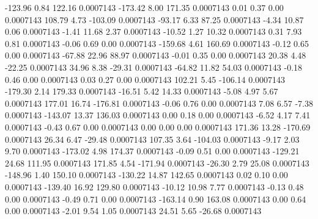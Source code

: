      -123.96        0.84      122.16     0.0007143
     -173.42        8.00      171.35     0.0007143
        0.01        0.37        0.00     0.0007143
      108.79        4.73     -103.09     0.0007143
      -93.17        6.33       87.25     0.0007143
       -4.34       10.87        0.06     0.0007143
       -1.41       11.68        2.37     0.0007143
      -10.52        1.27       10.32     0.0007143
        0.31        7.93        0.81     0.0007143
       -0.06        0.69        0.00     0.0007143
     -159.68        4.61      160.69     0.0007143
       -0.12        0.65        0.00     0.0007143
      -67.88       22.96       88.97     0.0007143
       -0.01        0.35        0.00     0.0007143
       20.38        4.48      -22.25     0.0007143
       34.96        8.38      -29.31     0.0007143
      -64.82       11.82       54.03     0.0007143
       -0.18        0.46        0.00     0.0007143
        0.03        0.27        0.00     0.0007143
      102.21        5.45     -106.14     0.0007143
     -179.30        2.14      179.33     0.0007143
      -16.51        5.42       14.33     0.0007143
       -5.08        4.97        5.67     0.0007143
      177.01       16.74     -176.81     0.0007143
       -0.06        0.76        0.00     0.0007143
        7.08        6.57       -7.38     0.0007143
     -143.07       13.37      136.03     0.0007143
        0.00        0.18        0.00     0.0007143
       -6.52        4.17        7.41     0.0007143
       -0.43        0.67        0.00     0.0007143
        0.00        0.00        0.00     0.0007143
      171.36       13.28     -170.69     0.0007143
       26.34        6.47      -29.48     0.0007143
      107.35        3.64     -104.03     0.0007143
       -9.17        2.03        9.70     0.0007143
     -173.02        4.98      174.37     0.0007143
       -0.09        0.51        0.00     0.0007143
     -129.21       24.68      111.95     0.0007143
      171.85        4.54     -171.94     0.0007143
      -26.30        2.79       25.08     0.0007143
     -148.96        1.40      150.10     0.0007143
     -130.22       14.87      142.65     0.0007143
        0.02        0.10        0.00     0.0007143
     -139.40       16.92      129.80     0.0007143
      -10.12       10.98        7.77     0.0007143
       -0.13        0.48        0.00     0.0007143
       -0.49        0.71        0.00     0.0007143
     -163.14        0.90      163.08     0.0007143
        0.00        0.64        0.00     0.0007143
       -2.01        9.54        1.05     0.0007143
       24.51        5.65      -26.68     0.0007143
